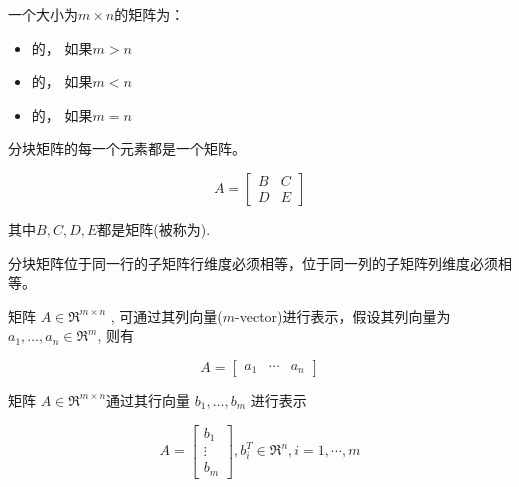 \begin{definition}[高形， 宽形和方形矩阵]
    一个大小为$m\times n$的矩阵为：
    \begin{itemize}
        \item {}的， 如果$m>n$
        \item {}的， 如果$m<n$
        \item {}的， 如果$m=n$
    \end{itemize}
\end{definition}

\begin{definition}[分块矩阵]
    分块矩阵的每一个元素都是一个矩阵。

    \begin{equation} A=\left[\begin{array}{ll}B & C \\ D & E\end{array}\right] \end{equation}

    其中$B,C,D,E$都是矩阵(被称为).
\end{definition}

分块矩阵位于同一行的子矩阵行维度必须相等，位于同一列的子矩阵列维度必须相等。

\begin{definition}[矩阵的列向量表示]
    矩阵 $ A \in \mathfrak{R}^{m \times n} $ , 可通过其列向量($m$-vector)进行表示，假设其列向量为 $ a_{1}, \ldots, a_{n} \in \mathfrak{R}^{m} $, 则有

    \begin{equation} A=\left[\begin{array}{lll}a_{1} & \cdots & a_{n}\end{array}\right] \end{equation}
\end{definition}

\begin{definition}[矩阵的行向量表示]
    矩阵 $ A \in \mathfrak{R}^{m \times n} $通过其行向量 $ b_{1}, \ldots, b_{m} $ 进行表示

    \begin{equation} A=\left[\begin{array}{c}b_{1} \\ \vdots \\ b_{m}\end{array}\right], b_{i}^{T} \in \mathfrak{R}^{n}, i=1, \cdots, m \end{equation}
\end{definition}

